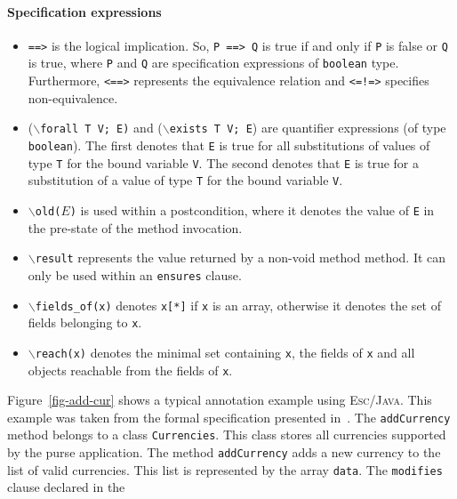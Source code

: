 \documentclass[a4paper]{llncs}
\newcommand{\escj}{\textsc{Esc/Java}}
\begin{document}
 
 
\paragraph{\bf Specification expressions} 
\begin{itemize} 
\item{\texttt{==>}} is the logical implication. So, \texttt{P 
==> Q} is true if and only if \texttt{P} is false or \texttt{Q} is 
true, where \texttt{P} and \texttt{Q} are specification expressions of  
\texttt{boolean} type. Furthermore, \texttt{<==>} represents the 
equivalence relation and \texttt{<=!=>} specifies non-equivalence. 
 
\item {($\backslash$\texttt{forall T V; E)} and 
($\backslash$\texttt{exists T V; E})} are quantifier expressions (of 
type \texttt{boolean}).  The first denotes that \texttt{E} is true 
for all substitutions of values of type \texttt{T} for the bound 
variable \texttt{V}. The second denotes that \texttt{E} is true 
for a substitution of a value of type \texttt{T} for the bound 
variable \texttt{V}. 
 
\item{\texttt{$\backslash$old($E$)}} is used within a postcondition, where it
denotes the value of \texttt{E} in the pre-state of the method invocation. 
 
\item {\tt$\backslash$result} represents the value returned by 
a non-void method method. It can only be used within an 
\texttt{ensures} clause. 

\item{\texttt{$\backslash$fields\_of(x)}} denotes \texttt{x[*]} if
\texttt{x} is an array, otherwise it denotes the set of fields
belonging to \texttt{x}.

\item{\texttt{$\backslash$reach(x)}} denotes the minimal set
containing \texttt{x}, the fields of \texttt{x} and all objects
reachable from the fields of \texttt{x}.
\end{itemize} 
Figure~\ref{fig-add-cur} shows a typical annotation example using 
\escj. This example was taken from the formal specification presented
in~\cite{CH01Url}. The \texttt{addCurrency}
method belongs
to a class \texttt{Currencies}. This class stores all currencies 
supported by the purse application. The method 
\texttt{addCurrency} adds a new currency to the list of valid 
currencies. This list is represented by the 
array \texttt{data}. The \texttt{modifies} clause declared in the 
\end{document}
